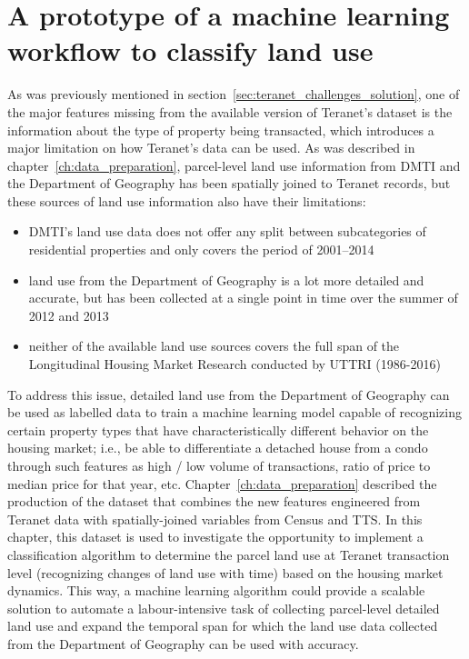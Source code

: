 \chapter{A prototype of a machine learning workflow to classify land use} \label{ch:ml_workflow}

As was previously mentioned in section~\ref{sec:teranet_challenges_solution}, one of the major features missing from the available version of Teranet's dataset is the information about the type of property being transacted, which introduces a major limitation on how Teranet's data can be used.
As was described in chapter~\ref{ch:data_preparation}, parcel-level land use information from DMTI and the Department of Geography has been spatially joined to Teranet records, but these sources of land use information also have their limitations:

\begin{itemize}
    \item DMTI's land use data does not offer any split between subcategories of residential properties and only covers the period of 2001--2014
    \item land use from the Department of Geography is a lot more detailed and accurate, but has been collected at a single point in time over the summer of 2012 and 2013
    \item neither of the available land use sources covers the full span of the Longitudinal Housing Market Research conducted by UTTRI (1986-2016)
\end{itemize}


To address this issue, detailed land use from the Department of Geography can be used as labelled data to train a machine learning model capable of recognizing certain property types that have characteristically different behavior on the housing market;
i.e., be able to differentiate a detached house from a condo through such features as high / low volume of transactions, ratio of price to median price for that year, etc.
Chapter~\ref{ch:data_preparation} described the production of the dataset that combines the new features engineered from Teranet data with spatially-joined variables from Census and TTS\@.
In this chapter, this dataset is used to investigate the opportunity to implement a classification algorithm to determine the parcel land use at Teranet transaction level (recognizing changes of land use with time) based on the housing market dynamics.
This way, a machine learning algorithm could provide a scalable solution to automate a labour-intensive task of collecting parcel-level detailed land use and expand the temporal span for which the land use data collected from the Department of Geography can be used with accuracy.

